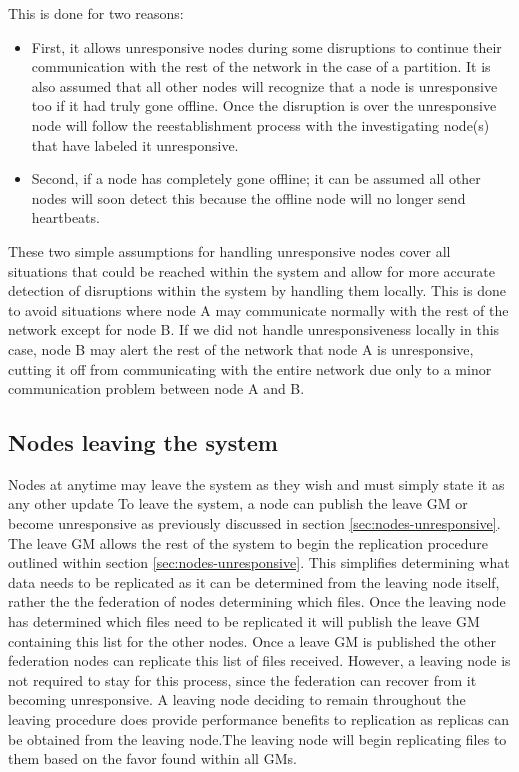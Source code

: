This is done for two reasons:
\begin{itemize}
    \item First, it allows unresponsive nodes during some disruptions to continue their communication with the rest of the network in the case of a partition. It is also assumed that all other nodes will recognize that a node is unresponsive too if it had truly gone offline. Once the disruption is over the unresponsive node will follow the reestablishment process with the investigating node(s) that have labeled it unresponsive.

    \item Second, if a node has completely gone offline; it can be assumed all other nodes will soon detect this because the offline node will no longer send heartbeats.
\end{itemize}

These two simple assumptions for handling unresponsive nodes cover all situations that could be reached within the system and allow for more accurate detection of disruptions within the system by handling them locally. 
This is done to avoid situations where node A may communicate normally with the rest of the network except for node B. If we did not handle unresponsiveness locally in this case, node B may alert the rest of the network that node A is unresponsive, cutting it off from communicating with the entire network due only to a minor communication problem between node A and B.

\subsection{Nodes leaving the system}
Nodes at anytime may leave the system as they wish and must simply state it as any other update To leave the system, a node can publish the leave GM or become unresponsive as previously discussed in section \ref{sec:nodes-unresponsive}. The leave GM allows the rest of the system to begin the replication procedure outlined within section \ref{sec:nodes-unresponsive}. This simplifies determining what data needs to be replicated as it can be determined from the leaving node itself, rather the the federation of nodes determining which files. Once the leaving node has determined which files need to be replicated it will publish the leave GM containing this list for the other nodes. Once a leave GM is published the other federation nodes can replicate this list of files received. However, a leaving node is not required to stay for this process, since the federation can recover from it becoming unresponsive. A leaving node deciding to remain throughout the leaving procedure does provide performance benefits to replication as replicas can be obtained from the leaving node.The leaving node will begin replicating files to them based on the favor found within all GMs.


